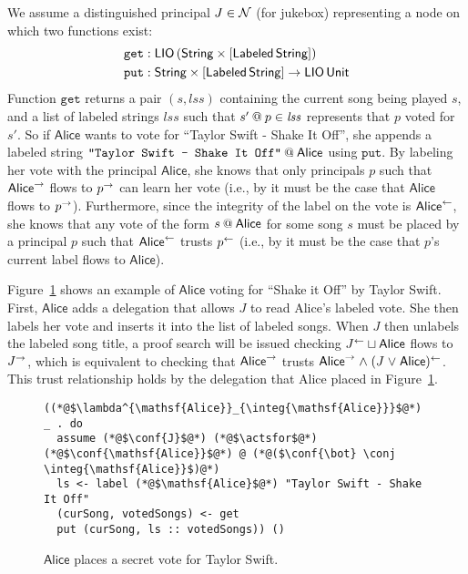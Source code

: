 We assume a distinguished principal $J \in \Nameset$ (for jukebox) representing a node on which two functions exist:
\begin{align*}
\mathtt{get}&: \liotype{(\pair{\String}{\listtype{\labeled{\String}}})}\\
\mathtt{put}&: \pair{\String}{\listtype{\labeled{\String}}} \to \liotype{\unit}
\end{align*}
Function $\mathtt{get}$ returns a pair $(\mathit{s}, \mathit{lss})$ containing the current song being played $s$, and a list of labeled strings $\mathit{lss}$ such that $\lb{p}{s'} \in \mathit{lss}$ represents that $p$ voted for $s'$. So if $\mathsf{Alice}$ wants to vote for ``Taylor Swift - Shake It Off'', she appends a labeled string $\lb{\mathsf{Alice}}{\texttt{"Taylor Swift - Shake It Off"}}$ using $\mathtt{put}$. By labeling her vote with the principal $\mathsf{Alice}$, she knows that only principals $p$ such that $\conf{\mathsf{Alice}}$ flows to $\conf{p}$ can learn her vote (i.e., by  it must be the case that $\mathsf{Alice}$ flows to $\conf{p}$). Furthermore, since the integrity of the label on the vote is $\integ{\mathsf{Alice}}$, she knows that any vote of the form $\lb{\mathsf{Alice}}{s}$ for some song $s$ must be placed by a principal $p$ such that $\integ{\mathsf{Alice}}$ trusts $\integ{p}$ (i.e., by  it must be the case that $p$'s current label flows to $\mathsf{Alice}$).

Figure~\ref{fig:jukebox-alice-votes-for-taylor-swift} shows an example of $\mathsf{Alice}$ voting for ``Shake it Off'' by Taylor Swift. First, $\mathsf{Alice}$ adds a delegation that allows $J$ to read Alice's labeled vote. She then labels her vote and inserts it into the list of labeled songs. When $J$ then unlabels the labeled song title, a proof search will be issued checking $\integ{J} \join \mathsf{Alice}$ flows to $\conf{J}$, which is equivalent to checking that $\conf{\mathsf{Alice}}$ trusts $\conf{\mathsf{Alice}} \conj \integ{(J \disj \mathsf{Alice})}$. This trust relationship holds by the delegation that Alice placed in Figure~\ref{fig:jukebox-alice-votes-for-taylor-swift}.

\begin{figure}
\centering
\begin{lstlisting}
((*@$\lambda^{\mathsf{Alice}}_{\integ{\mathsf{Alice}}}$@*) _ . do
  assume (*@$\conf{J}$@*) (*@$\actsfor$@*) (*@$\conf{\mathsf{Alice}}$@*) @ (*@($\conf{\bot} \conj \integ{\mathsf{Alice}}$)@*)
  ls <- label (*@$\mathsf{Alice}$@*) "Taylor Swift - Shake It Off"
  (curSong, votedSongs) <- get
  put (curSong, ls :: votedSongs)) ()
\end{lstlisting}
\caption{$\mathsf{Alice}$ places a secret vote for Taylor Swift.}
\label{fig:jukebox-alice-votes-for-taylor-swift}
\end{figure}

